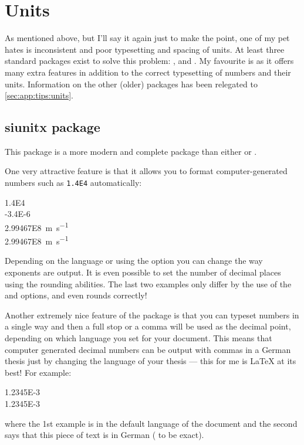 \section{Units}%
\label{sec:tips:units}

As mentioned above, but I'll say it again just to make the point,
one of my pet hates is inconsistent and poor typesetting and spacing
of units. At least three standard packages exist to solve this
problem: ,  and . My
favourite is  as it offers many extra features in
addition to the correct typesetting of numbers and their units.
Information on the other (older) packages has been relegated to
\cref{sec:app:tips:units}.


\subsection{siunitx package}%
\label{sec:tips:siunitx}

This package is a more modern and complete package than either
 or .

One very attractive feature is that it allows you to format
computer-generated numbers
such as \verb+1.4E4+ automatically:
\begin{tcblisting}{}
\num{1.4E4}\\
\num[exponent-product=\cdot]{-3.4E-6}\\
\SI{2.99467E8}{\metre\per\second}\\
\SI[round-mode=places,round-precision=1]{2.99467E8}{\m.\s^{-1}}
\end{tcblisting}
\noindent
Depending on the language or using the option 
you can change the way exponents are output.
It is even possible to set the number of decimal places
using the rounding abilities.
The last two examples only differ by the use of the  and
 options, and even rounds correctly!

Another extremely nice feature of the package is that you can typeset
numbers in a single way and then a full stop or a comma will be used
as the decimal point, depending on which language you set for your
document. This means that computer generated decimal numbers can be
output with commas in a German thesis just by changing the language of
your thesis --- this for me is \LaTeX{} at its best! For example:
\begin{tcblisting}{}
\num{1.2345E-3}\\
\foreignlanguage{ngerman}{\num{1.2345E-3}}
\end{tcblisting}
\noindent
where the 1st example is in the default language of the document and
the second says that this piece of text is in German
( to be exact).

